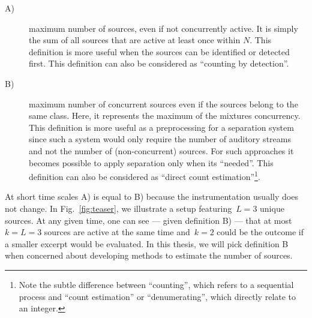 \begin{description}
\item[A)] maximum number of sources, even if not concurrently active. It is simply the sum of all sources that are active at least once within \(N\). This definition is more useful when the sources can be identified or detected first. This definition can also be considered as ``counting by detection''.
\item[B)] maximum number of concurrent sources even if the sources belong to the same class. Here, it represents the maximum of the mixtures concurrency. This definition is more useful as a preprocessing for a separation system since such a system would only require the number of auditory streams and not the number of (non-concurrent) sources. For such approaches it becomes possible to apply separation only when its ``needed''. This definition can also be considered as ``direct count estimation''\footnote{Note the subtle difference between ``counting'', which refers to a sequential process and ``count estimation'' or ``denumerating'', which directly relate to an integer.}.
\end{description}

At short time scales A) is equal to B) because the instrumentation usually does not change. 
In Fig.~\ref{fig:teaser}, we illustrate a setup featuring~$L=3$ unique sources.
At any given time, one can see --- given definition B) --- that at most~$k=L=3$ sources are active at the same time and~$k=2$ could be the outcome if a smaller excerpt would be evaluated.
In this thesis, we will pick definition B when concerned about developing methods to estimate the number of sources.